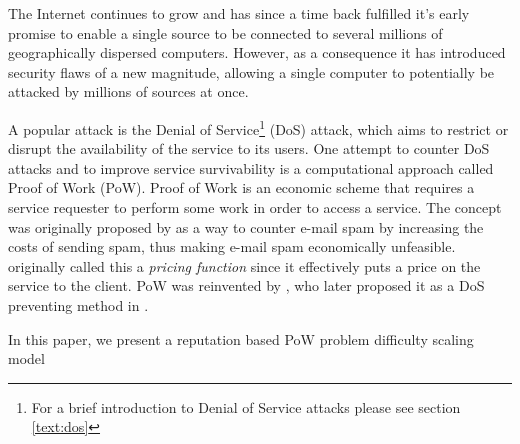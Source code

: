 The Internet continues to grow and has since a time back fulfilled it's early promise to enable a single source to be connected to several millions of geographically dispersed computers. However, as a consequence it has introduced security flaws of a new magnitude, allowing a single computer to potentially be attacked by millions of sources at once.

A popular attack is the Denial of Service\footnote{For a brief introduction to Denial of Service attacks please see section \ref{text:dos}} (DoS) attack, which aims to restrict or disrupt the availability of the service to its users.
One attempt to counter DoS attacks and to improve service survivability is a computational approach called Proof of Work (PoW).
Proof of Work is an economic scheme that requires a service requester to perform some work in order to access a service.
The concept was originally proposed by \citeauthor{DworkN92}\cite{DworkN92} as a way to counter e-mail spam by increasing the costs of sending spam, thus making e-mail spam economically unfeasible.
\citeauthor{DworkN92} originally called this a \emph{pricing function} since it effectively puts a price on the service to the client.
PoW was reinvented by \citeauthor{Back02}, who later proposed it as a DoS preventing method in . 

In this paper, we present a reputation based PoW problem difficulty scaling model

 



